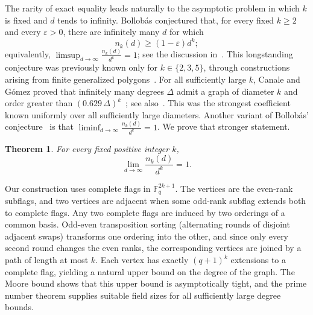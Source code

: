 \documentclass[11pt]{article}
\theoremstyle{plain}
\newtheorem{theorem}{Theorem}[section]
\theoremstyle{definition}
\begin{document}
The rarity of exact equality leads naturally to the asymptotic problem in which $k$ is fixed and $d$ tends to infinity.  Bollob\'as conjectured that, for every fixed $k\ge2$ and every $\varepsilon>0$, there are infinitely many $d$ for which
$$ n_k(d)\ge(1-\varepsilon)d^k;$$
equivalently, $\limsup_{d\to\infty}\frac{n_k(d)}{d^k}=1$; see the discussion in~\cite[p.~2]{CCJK}. This longstanding conjecture was previously known only for $k\in\{2,3,5\}$, through constructions arising from finite generalized polygons~\cite{Del1,Del2,BSS}.  For all sufficiently large $k$, Canale and G\'omez proved that infinitely many degrees $\Delta$ admit a graph of diameter $k$ and order greater than $(0.629\,\Delta)^k$~\cite{CG}; see also~\cite[Proposition~5]{CCJK}.  This was the strongest coefficient known uniformly over all sufficiently large diameters. 
Another variant of Bollob\'as' conjecture~\cite{Bol, Bol_later}
is that $\liminf_{d\to\infty}\frac{n_k(d)}{d^k}=1$. We prove that stronger statement.

\begin{theorem}\label{thm:vertex}
For every fixed positive integer $k$,
\begin{equation}\label{eq:vertex-limit}
  \lim_{d\to\infty}\frac{n_k(d)}{d^k}=1.
\end{equation}
\end{theorem}


Our construction uses complete flags in $\mathbb F_q^{2k+1}$.  The vertices are the even-rank subflags, and two vertices are adjacent when some odd-rank subflag extends both to complete flags. 
Any two complete flags are induced by two orderings of a common basis. Odd-even transposition sorting (alternating rounds of disjoint adjacent swaps) transforms one ordering into the other, and since only every second round changes the even ranks, the corresponding vertices are joined by a path of length at most $k$. Each vertex has exactly $(q + 1)^k$ extensions to a complete flag, yielding a natural upper bound on the degree of the graph. The Moore bound shows that this upper bound is asymptotically tight, and the prime number theorem supplies suitable field sizes for all sufficiently large degree bounds.
\end{document}
